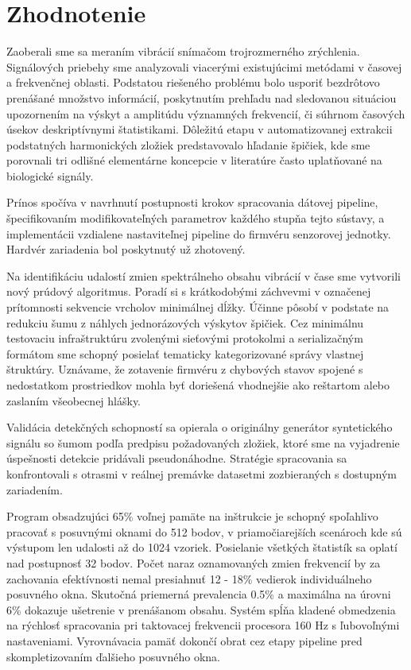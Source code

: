 \chapter{Zhodnotenie} \label{chapter:evaluation}
Zaoberali sme sa meraním vibrácií snímačom trojrozmerného zrýchlenia.
Signálových priebehy sme analyzovali viacerými existujúcimi metódami v časovej a frekvenčnej oblasti.
Podstatou riešeného problému bolo usporiť bezdrôtovo prenášané množstvo informácií, poskytnutím
prehľadu nad sledovanou situáciou upozornením na výskyt a amplitúdu významných frekvencií, či súhrnom
časových úsekov deskriptívnymi štatistikami. Dôležitú etapu v automatizovanej extrakcii
podstatných harmonických zložiek predstavovalo hľadanie špičiek, kde sme porovnali tri odlišné
elementárne koncepcie v literatúre často uplatňované na biologické signály.

Prínos spočíva v navrhnutí postupnosti krokov spracovania dátovej pipeline, špecifikovaním
modifikovateľných parametrov každého stupňa tejto sústavy, a implementácii vzdialene nastaviteľnej
pipeline do firmvéru senzorovej jednotky. Hardvér zariadenia bol poskytnutý už zhotovený.

Na identifikáciu udalostí zmien spektrálneho obsahu vibrácií v čase sme vytvorili nový prúdový algoritmus.
Poradí si s krátkodobými záchvevmi v označenej prítomnosti sekvencie vrcholov minimálnej dĺžky. Účinne pôsobí
v podstate na redukciu šumu z náhlych jednorázových výskytov špičiek. Cez minimálnu testovaciu infraštruktúru
zvolenými sieťovými protokolmi a serializačným formátom sme schopný posielať tematicky kategorizované správy vlastnej
štruktúry. Uznávame, že zotavenie firmvéru z chybových stavov spojené s nedostatkom prostriedkov mohla byť
doriešená vhodnejšie ako reštartom alebo zaslaním všeobecnej hlášky.

Validácia detekčných schopností sa opierala o originálny generátor syntetického signálu so šumom podľa
predpisu požadovaných zložiek, ktoré sme na vyjadrenie úspešnosti detekcie pridávali pseudonáhodne.
Stratégie spracovania sa konfrontovali s otrasmi v reálnej premávke datasetmi
zozbieraných s dostupným zariadením.

Program obsadzujúci 65\% voľnej pamäte na inštrukcie je schopný spoľahlivo pracovať s posuvnými
oknami do 512 bodov, v priamočiarejších scenároch kde sú výstupom len udalosti až do 1024 vzoriek.
Posielanie všetkých štatistík sa oplatí nad postupnosť 32 bodov. Počet naraz oznamovaných
zmien frekvencií by za zachovania efektívnosti nemal presiahnuť 12 - 18\% vedierok individuálneho posuvného
okna. Skutočná priemerná prevalencia 0.5\% a maximálna na úrovni 6\% dokazuje ušetrenie v prenášanom obsahu.
Systém spĺňa kladené obmedzenia na rýchlosť spracovania pri taktovacej frekvencii procesora 160 Hz s ľubovoľnými
nastaveniami. Vyrovnávacia pamäť dokončí obrat cez etapy pipeline pred skompletizovaním ďalšieho posuvného okna.

